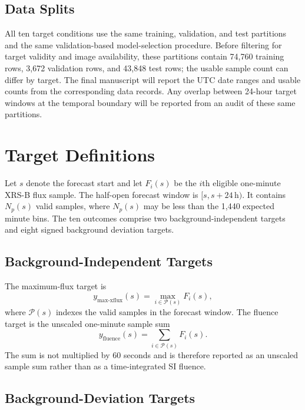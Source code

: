\documentclass[12pt]{report}
\begin{document}
\subsection{Data Splits}

All ten target conditions use the same training, validation, and test partitions and the same validation-based model-selection procedure. Before filtering for target validity and image availability, these partitions contain 74,760 training rows, 3,672 validation rows, and 43,848 test rows; the usable sample count can differ by target. The final manuscript will report the UTC date ranges and usable counts from the corresponding data records. Any overlap between 24-hour target windows at the temporal boundary will be reported from an audit of these same partitions.

\section{Target Definitions}

Let $s$ denote the forecast start and let $F_i(s)$ be the $i$th eligible one-minute XRS-B flux sample. The half-open forecast window is $[s,s+24\,\mathrm{h})$. It contains $N_p(s)$ valid samples, where $N_p(s)$ may be less than the 1,440 expected minute bins. The ten outcomes comprise two background-independent targets and eight signed background deviation targets.

\subsection{Background-Independent Targets}

The maximum-flux target is
\begin{equation}
 y_{\mathrm{max\text{-}xflux}}(s)
 = \max_{i\in\mathcal{P}(s)} F_i(s),
\end{equation}
where $\mathcal{P}(s)$ indexes the valid samples in the forecast window. The fluence target is the unscaled one-minute sample sum
\begin{equation}
 y_{\mathrm{fluence}}(s)
 = \sum_{i\in\mathcal{P}(s)} F_i(s).
\end{equation}
The sum is not multiplied by 60 seconds and is therefore reported as an unscaled sample sum rather than as a time-integrated SI fluence.

\subsection{Background-Deviation Targets}
\end{document}
